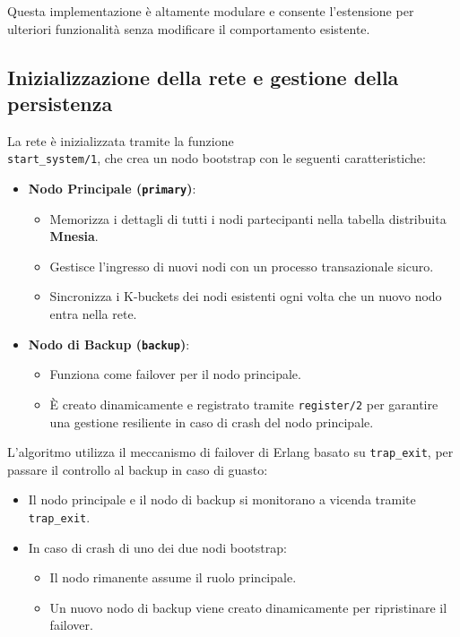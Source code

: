 \documentclass{article}
\begin{document}
Questa implementazione è altamente modulare e consente l'estensione per ulteriori funzionalità senza modificare il comportamento esistente.

\subsection{Inizializzazione della rete e gestione della persistenza}
La rete è inizializzata tramite la funzione \\ \texttt{start\_system/1}, che crea un nodo bootstrap con le seguenti caratteristiche:
\begin{itemize}
    \item \textbf{Nodo Principale (\texttt{primary})}:
    \begin{itemize}
        \item Memorizza i dettagli di tutti i nodi partecipanti nella tabella distribuita \textbf{Mnesia}.
        \item Gestisce l'ingresso di nuovi nodi con un processo transazionale sicuro.
        \item Sincronizza i K-buckets dei nodi esistenti ogni volta che un nuovo nodo entra nella rete.
    \end{itemize}
    \item \textbf{Nodo di Backup (\texttt{backup})}:
    \begin{itemize}
        \item Funziona come failover per il nodo principale.
        \item È creato dinamicamente e registrato tramite \texttt{register/2} per garantire una gestione resiliente in caso di crash del nodo principale.
    \end{itemize}
\end{itemize}

L'algoritmo utilizza il meccanismo di failover di Erlang basato su \texttt{trap\_exit}, per passare il controllo al backup in caso di guasto:
\begin{itemize}
    \item Il nodo principale e il nodo di backup si monitorano a vicenda tramite \texttt{trap\_exit}.
    \item In caso di crash di uno dei due nodi bootstrap:
    \begin{itemize}
        \item Il nodo rimanente assume il ruolo principale.
        \item Un nuovo nodo di backup viene creato dinamicamente per ripristinare il failover.
    \end{itemize}
\end{itemize}
\end{document}
